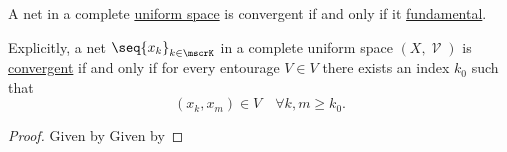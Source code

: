 \begin{theorem}\label{thm:cauchys_net_convergence_criterion}
  A net in a complete \hyperref[def:complete_uniform_space]{uniform space} is convergent if and only if it \hyperref[def:fundamental_net]{fundamental}.

  Explicitly, a net \( \seq{ x_k }_{k \in \mscrK} \) in a complete uniform space \( (X, \mscrV) \) is \hyperref[def:net_limit_point]{convergent} if and only if for every entourage \( V \in V \) there exists an index \( k_0 \) such that
  \begin{equation*}
    (x_k, x_m) \in V \quad\forall k, m \geq k_0.
  \end{equation*}
\end{theorem}
\begin{proof}
  \SufficiencySubProof Given by 
  \NecessitySubProof Given by 
\end{proof}
